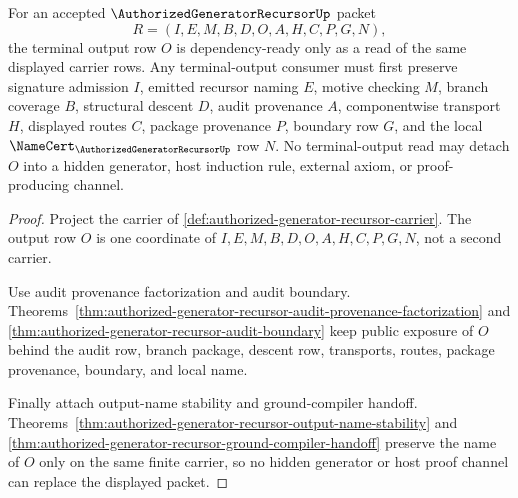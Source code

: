 \begin{theorem}
\label{thm:authorized-generator-recursor-terminal-output-readiness}
For an accepted $\AuthorizedGeneratorRecursorUp$ packet
$$
R=(I,E,M,B,D,O,A,H,C,P,G,N),
$$
the terminal output row $O$ is dependency-ready only as a read of the same displayed carrier rows. Any terminal-output consumer must first preserve signature admission $I$, emitted recursor naming $E$, motive checking $M$, branch coverage $B$, structural descent $D$, audit provenance $A$, componentwise transport $H$, displayed routes $C$, package provenance $P$, boundary row $G$, and the local $\NameCert_{\AuthorizedGeneratorRecursorUp}$ row $N$. No terminal-output read may detach $O$ into a hidden generator, host induction rule, external axiom, or proof-producing channel.
\end{theorem}
\begin{proof}
Project the carrier of \autoref{def:authorized-generator-recursor-carrier}. The output row $O$ is one coordinate of $I,E,M,B,D,O,A,H,C,P,G,N$, not a second carrier.

Use audit provenance factorization and audit boundary. Theorems~\ref{thm:authorized-generator-recursor-audit-provenance-factorization} and \ref{thm:authorized-generator-recursor-audit-boundary} keep public exposure of $O$ behind the audit row, branch package, descent row, transports, routes, package provenance, boundary, and local name.

Finally attach output-name stability and ground-compiler handoff. Theorems~\ref{thm:authorized-generator-recursor-output-name-stability} and \ref{thm:authorized-generator-recursor-ground-compiler-handoff} preserve the name of $O$ only on the same finite carrier, so no hidden generator or host proof channel can replace the displayed packet.
\end{proof}

